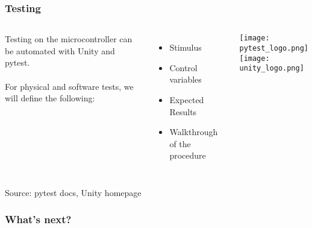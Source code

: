 \documentclass{beamer}
\begin{document}
\begin{frame}
  \frametitle{Testing}

  \begin{columns}
    Testing on the microcontroller can be automated with Unity and pytest.
    \\~\\
    For physical and software tests, we will define the following:
    \begin{itemize}
      \item Stimulus
      \item Control variables
      \item Expected Results
      \item Walkthrough of the procedure
    \end{itemize}

    \texttt{[image: pytest\_logo.png]} \\
    \texttt{[image: unity\_logo.png]}

  \end{columns}
  \hfill {\tiny Source: pytest docs, Unity homepage}
\end{frame}

\begin{frame}
  \frametitle{What's next?}
\end{frame}
\end{document}
